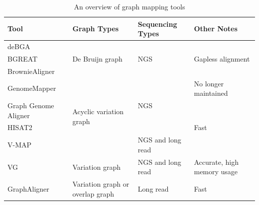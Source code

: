 \begin{table}[h!]
\centering
\caption{An overview of graph mapping tools}
\vspace{10mm}
\label{table:mappers}
\begin{tabular}{|p{2.25cm}|p{2.5cm}|p{1.75cm}|p{2.5cm}|}
 \hline
 \textbf{Tool} & \textbf{Graph Types} & \textbf{Sequencing Types} & \textbf{Other Notes} \\
 \hline
 \hline
deBGA & \multirow[c]{3}{=}{De Bruijn graph} & \multirow[c]{3}{=}{NGS} &  \\ \cline{1-1} \cline{4-4}
BGREAT &  &  & Gapless alignment  \\ \cline{1-1} \cline{4-4}
BrownieAligner &  &  &   \\ \hline
GenomeMapper & \multirow[c]{4}{=}{Acyclic variation graph} & \multirow[c]{3}{=}{NGS} & No longer maintained \\ \cline{1-1} \cline{4-4}
Graph Genome Aligner &  &  &  \\ \cline{1-1} \cline{4-4}
HISAT2 &  &  & Fast \\ \cline{1-1} \cline{3-4}
V-MAP &  & NGS and long read & \\ \hline
VG & Variation graph & NGS and long read & Accurate, high memory usage \\ \hline
GraphAligner & Variation graph or overlap graph & Long read & Fast \\ \hline

\end{tabular}
\end{table}

